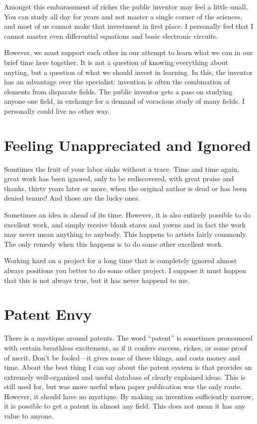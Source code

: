 \documentclass[
	fontsize=10pt, %
	twoside=false, %
	secnumdepth=1, %
]{kaobook}
\begin{document}
Amongst this embarassment of riches the public inventor
may feel a little small.
You can study all day for years and not master a single corner
of the sciences, and most of us cannot make that investment in
first place.
I personally feel that I cannot master even differential equations
and basic electronic circuits.

However, we must support each other in our attempt to learn what we can
in our brief time here together. It is not a question of knowing everything
about anyting, but a question of what we should invest in learning.
In this, the inventor has an advantage over the specialist:
invention is often the combination of elements from disparate fields.
The public inventor gets a pass on studying anyone one field,
in exchange for a demand of voracious study of many fields.
I personally could live no other way.

\section{Feeling Unappreciated and Ignored}

Somtimes the fruit of your labor sinks without a trace.
Time and time again, great work has been ignored, only to be
rediscovered, with great praise and thanks, thirty years later or more,
when the original author is dead or has been denied tenure!
And those are the lucky ones.

Sometimes an idea is ahead of its time.
However, it is also entirely possible to do excellent work, and simply
receive blank stares and yawns and in fact the work may never
mean anything to anybody.
This happens to artists fairly commonly.
The only remedy when this happens is to do some other excellent work.

Working hard on a project for a long time that is completely ignored
almost always positions you better to do some other project.
I suppose it must happen that this is not always true,
but it has never happend to me.

\section{Patent Envy}

There is a mystique around patents.
The word ``patent'' is sometimes pronounced with certain
breathless excitement, as if it confers success, riches,
or some proof of merit.
Don't be fooled---it gives none of these things,
and costs money and time.
About the best thing I can say about the patent system
is that provides an extremely well-organized and useful
database of clearly explained ideas.
This is still used for, but was more useful
when paper publication was the only route.
However, it should have no mystique.
By making an invention sufficiently narrow, it
is possible to get a patent in almost any field.
This does not mean it has any value to anyone.
\end{document}

